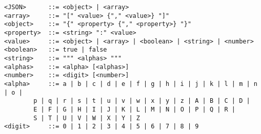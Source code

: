 \begin{minipage}{10cm}
\footnotesize
\begin{lstlisting}[caption=JSON grammar provided in~\cite{GramTest}., label=JSONgrammar]
<JSON>      ::= <object> | <array>
<array>     ::= "[" <value> {"," <value>} "]"
<object>    ::= "{" <property> {"," <property>} "}"
<property>  ::= <string> ":" <value>
<value>     ::= <object> | <array> | <boolean> | <string> | <number>
<boolean>   ::= true | false
<string>    ::= """ <alphas> """
<alphas>    ::= <alpha> [<alphas>]
<number>    ::= <digit> [<number>]
<alpha>	    ::= a | b | c | d | e | f | g | h | i | j | k | l | m | n | o | 
		p | q | r | s | t | u | v | w | x | y | z | A | B | C | D | 
		E | F | G | H | I | J | K | L | M | N | O | P | Q | R | 
		S | T | U | V | W | X | Y | Z
<digit>     ::= 0 | 1 | 2 | 3 | 4 | 5 | 6 | 7 | 8 | 9
\end{lstlisting}
\end{minipage}
